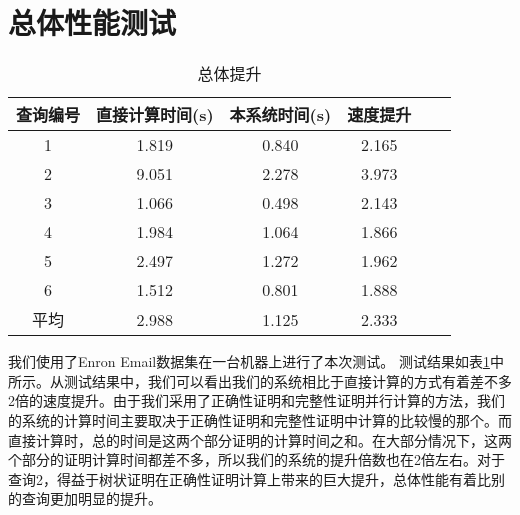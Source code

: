 \section {总体性能测试}

\begin{table}[htb]
    \centering
    \caption{总体提升}
    \begin{tabular}{cccccc}
        \toprule
        查询编号 & 直接计算时间(s) & 本系统时间(s) & 速度提升 \\
        \midrule
        1 & 1.819 & 0.840 & 2.165 \\
        2 & 9.051 & 2.278 & 3.973 \\
        3 & 1.066 & 0.498 & 2.143 \\
        4 & 1.984 & 1.064 & 1.866 \\
        5 & 2.497 & 1.272 & 1.962 \\
        6 & 1.512 & 0.801 & 1.888 \\
        \midrule
        平均 & 2.988 & 1.125 & 2.333 \\
        \bottomrule
    \end{tabular}
    \label{tab:overall_speedup}
\end{table}

我们使用了Enron Email数据集在一台机器上进行了本次测试。
测试结果如表\ref{tab:overall_speedup}中所示。从测试结果中，我们可以看出我们的系统相比于直接计算的方式有着差不多2倍的速度提升。由于我们采用了正确性证明和完整性证明并行计算的方法，我们的系统的计算时间主要取决于正确性证明和完整性证明中计算的比较慢的那个。而直接计算时，总的时间是这两个部分证明的计算时间之和。在大部分情况下，这两个部分的证明计算时间都差不多，所以我们的系统的提升倍数也在2倍左右。对于查询2，得益于树状证明在正确性证明计算上带来的巨大提升，总体性能有着比别的查询更加明显的提升。

